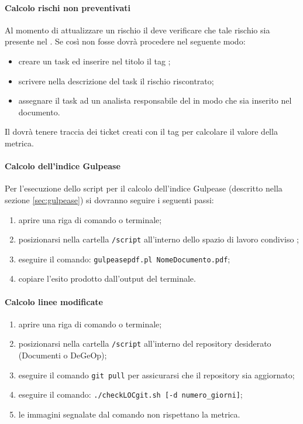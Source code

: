 	        \paragraph{Calcolo rischi non preventivati}\label{sec:rnp}
	        Al momento di attualizzare un rischio il \responsabilediprogetto{} deve verificare che tale rischio sia presente nel \pdp{}. Se così non fosse dovrà procedere nel seguente modo:
	        \begin{itemize}
	        	\item creare un task ed inserire nel titolo il tag \cit{[RISK]};
	        	\item scrivere nella descrizione del task il rischio riscontrato;
	        	\item assegnare il task ad un analista responsabile del \pdp{} in modo che sia inserito nel documento.
	        \end{itemize}
	        Il \responsabilediprogetto{} dovrà tenere traccia dei ticket creati con il tag \cit{[RISK]} per calcolare il valore della metrica.
	        \paragraph{Calcolo dell'indice Gulpease} \label{sec:calcoloGulpease}
	        Per l'esecuzione dello script per il calcolo dell'indice Gulpease (descritto nella sezione \ref{sec:gulpease}) si dovranno seguire i seguenti passi:
	        \begin{enumerate}
	        	\item aprire una riga di comando o terminale;
	        	\item posizionarsi nella cartella \texttt{/script} all'interno dello spazio di lavoro condiviso ;
	        	\item eseguire il comando: \texttt{gulpeasepdf.pl NomeDocumento.pdf};
	        	\item copiare l'esito prodotto dall'output del terminale.
	        \end{enumerate}
	        \paragraph{Calcolo linee modificate} \label{sec:loc}
	        \begin{enumerate}
	        	\item aprire una riga di comando o terminale;
	        	\item posizionarsi nella cartella \texttt{/script} all'interno del repository desiderato (Documenti o DeGeOp);
	        	\item eseguire il comando \texttt{git pull} per assicurarsi che il repository sia aggiornato;
	        	\item eseguire il comando: \texttt{./checkLOCgit.sh [-d numero\_giorni]};
	        	\item le immagini segnalate dal comando non rispettano la metrica.
	        \end{enumerate}
